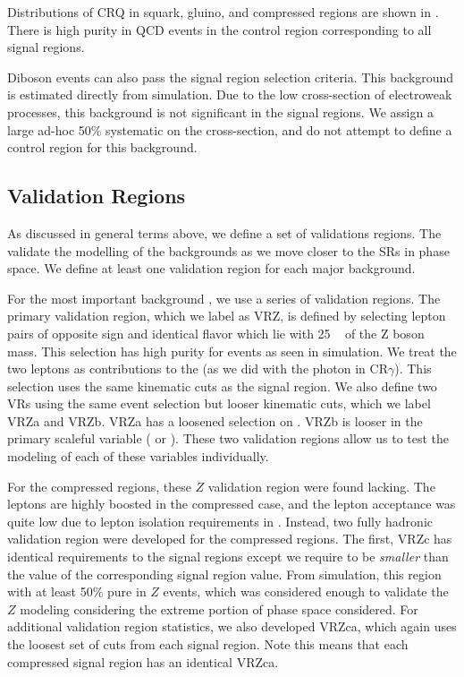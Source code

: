 Distributions of CRQ in squark, gluino, and compressed regions are shown in .
There is high purity in QCD events in the control region corresponding to all signal regions.

Diboson events can also pass the signal region selection criteria.
This background is estimated directly from simulation.
Due to the low cross-section of electroweak processes, this background is not significant in the signal regions.
We assign a large ad-hoc 50\% systematic on the cross-section, and do not attempt to define a control region for this background.



\subsection{Validation Regions}

As discussed in general terms above, we define a set of validations regions.
The validate the modelling of the backgrounds as we move closer to the SRs in phase space.
We define at least one validation region for each major background.

For the most important background \Zvv, we use a series of validation regions.
The primary validation region, which we label as VRZ, is defined by selecting lepton pairs of opposite sign and identical flavor which lie with 25 \GeV~ of the Z boson mass.
This selection has high purity for \Zll events as seen in simulation.
We treat the two leptons as contributions to the \met (as we did with the photon in CR$\gamma$).
This selection uses the same kinematic cuts as the signal region.
We also define two VRs using the same event selection but looser kinematic cuts, which we label VRZa and VRZb.
VRZa has a loosened selection on .
VRZb is looser in the primary scaleful variable  ( or ).
These two validation regions allow us to test the modeling of each of these variables individually.

For the compressed regions, these $Z$ validation region were found lacking.
The leptons are highly boosted in the compressed case, and the lepton acceptance was quite low due to lepton isolation requirements in \deltaR.
Instead, two fully hadronic validation region were developed for the compressed regions.
The first, VRZc has identical requirements to the signal regions except we require \dphiISR to be \textit{smaller} than the value of the corresponding signal region value.
From simulation, this region with at least 50\% pure in $Z$ events, which was considered enough to validate the $Z$ modeling considering the extreme portion of phase space considered.
For additional validation region statistics, we also developed VRZca, which again uses the loosest set of cuts from each signal region.
Note this means that each compressed signal region has an identical VRZca.


